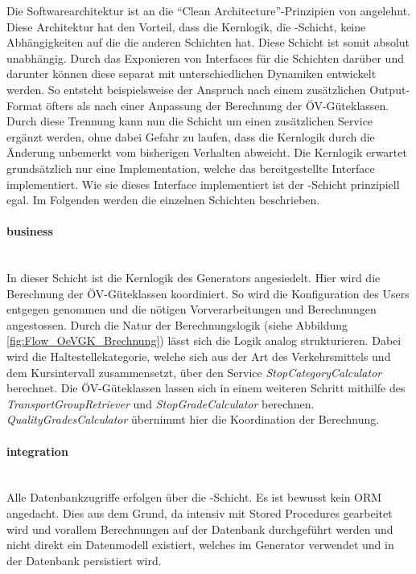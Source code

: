 Die Softwarearchitektur ist an die "`Clean Architecture"'-Prinzipien von \cite{martin_clean_architecture} angelehnt.
Diese Architektur hat den Vorteil, dass die Kernlogik, die \emph{}-Schicht, keine Abhängigkeiten auf die die anderen Schichten hat.
Diese Schicht ist somit absolut unabhängig.
Durch das Exponieren von Interfaces für die Schichten darüber und darunter können diese separat mit unterschiedlichen Dynamiken entwickelt werden.
So entsteht beispielsweise der Anspruch nach einem zusätzlichen Output-Format öfters als nach einer Anpassung der Berechnung der \gls{ÖV-Güteklassen}.
Durch diese Trennung kann nun die Schicht  um einen zusätzlichen Service ergänzt werden, ohne dabei Gefahr zu laufen, dass die Kernlogik durch die Änderung unbemerkt vom bisherigen Verhalten abweicht.
Die Kernlogik erwartet grundsätzlich nur eine Implementation, welche das bereitgestellte Interface implementiert.
Wie sie dieses Interface implementiert ist der \emph{}-Schicht prinzipiell egal.
Im Folgenden werden die einzelnen Schichten beschrieben.

\paragraph{business}~\\
\label{layer:business}
In dieser Schicht ist die Kernlogik des Generators angesiedelt.
Hier wird die Berechnung der \gls{ÖV-Güteklassen} koordiniert.
So wird die Konfiguration des Users entgegen genommen und die nötigen Vorverarbeitungen und Berechnungen angestossen.
Durch die Natur der Berechnungslogik (siehe Abbildung \ref{fig:Flow_OeVGK_Brechnung}) lässt sich die Logik analog strukturieren.
Dabei wird die Haltestellekategorie, welche sich aus der Art des Verkehrsmittels und dem Kursintervall zusammensetzt, über den Service \emph{StopCategoryCalculator} berechnet.
Die \gls{ÖV-Güteklassen} lassen sich in einem weiteren Schritt mithilfe des \emph{TransportGroupRetriever} und \emph{StopGradeCalculator} berechnen.
\emph{QualityGradesCalculator} übernimmt hier die Koordination der Berechnung.

\paragraph{integration}~\\
\label{layer:integration}
Alle Datenbankzugriffe erfolgen über die \emph{}-Schicht.
Es ist bewusst kein \acl{ORM} angedacht.
Dies aus dem Grund, da intensiv mit \glspl{Stored Procedure} gearbeitet wird und vorallem Berechnungen auf der Datenbank durchgeführt werden und nicht direkt ein Datenmodell existiert, welches im Generator verwendet und in der Datenbank persistiert wird.

